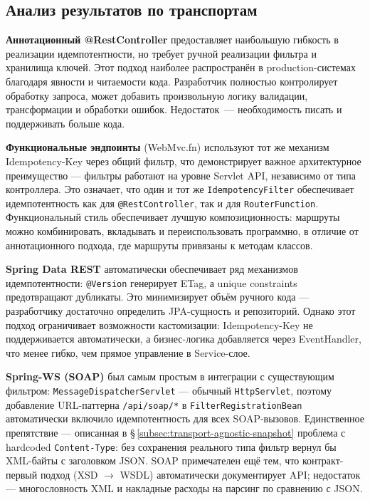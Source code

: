 \subsection{Анализ результатов по транспортам}

\textbf{Аннотационный \mbox{@RestController}} предоставляет наибольшую гибкость в реализации идемпотентности, но требует ручной реализации фильтра и хранилища ключей. Этот подход наиболее распространён в production-системах благодаря явности и читаемости кода. Разработчик полностью контролирует обработку запроса, может добавить произвольную логику валидации, трансформации и обработки ошибок. Недостаток~--- необходимость писать и поддерживать больше кода.

\textbf{Функциональные эндпоинты} (WebMvc.fn) используют тот же механизм Idempotency-Key через общий фильтр, что демонстрирует важное архитектурное преимущество --- фильтры работают на уровне Servlet API, независимо от типа контроллера. Это означает, что один и тот же \texttt{IdempotencyFilter} обеспечивает идемпотентность как для \mbox{\texttt{@RestController}}, так и для \texttt{RouterFunction}. Функциональный стиль обеспечивает лучшую композиционность: маршруты можно комбинировать, вкладывать и переиспользовать программно, в отличие от аннотационного подхода, где маршруты привязаны к методам классов.

\textbf{Spring Data REST} автоматически обеспечивает ряд механизмов идемпотентности: \texttt{@Version} генерирует ETag, а unique constraints предотвращают дубликаты. Это минимизирует объём ручного кода --- разработчику достаточно определить JPA-сущность и репозиторий. Однако этот подход ограничивает возможности кастомизации: Idempotency-Key не поддерживается автоматически, а бизнес-логика добавляется через EventHandler, что менее гибко, чем прямое управление в Service-слое.

\textbf{Spring-WS (SOAP)} был самым простым в интеграции с существующим фильтром: \texttt{MessageDispatcherServlet} --- обычный \texttt{HttpServlet}, поэтому добавление URL-паттерна \texttt{/api/soap/*} в \texttt{FilterRegistrationBean} автоматически включило идемпотентность для всех SOAP-вызовов. Единственное препятствие --- описанная в \S\,\ref{subsec:transport-agnostic-snapshot} проблема с hardcoded \texttt{Content-Type}: без сохранения реального типа фильтр вернул бы XML-байты с заголовком JSON. SOAP примечателен ещё тем, что контракт-первый подход (XSD $\to$ WSDL) автоматически документирует API; недостаток --- многословность XML и накладные расходы на парсинг по сравнению с JSON.

